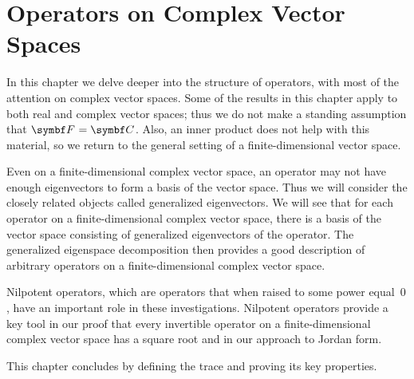 
\chapter{Operators on Complex Vector Spaces} \label{88}

In this chapter we delve deeper into the structure of operators, with most of the attention on complex vector spaces. Some of the results in this chapter apply to both real and complex vector spaces; thus we do not make a standing assumption that $\F{} = \C{}$. Also, an inner product does not help with this material, so we return to the general setting of a finite-dimensional vector space.

Even on a finite-dimensional complex vector space, an operator may not have enough eigenvectors to form a basis of the vector space. Thus we will consider the closely related objects called generalized eigenvectors. We will see that for each operator on a finite-dimensional complex vector space, there is a basis of the vector space consisting of generalized eigenvectors of the operator. The generalized eigenspace decomposition then provides a good description of arbitrary operators on a finite-dimensional complex vector space.

Nilpotent operators, which are operators that when raised to some power equal~$0$, have an important role in these investigations. Nilpotent operators provide a key tool in our proof that every invertible operator on a finite-dimensional complex vector space has a square root and in our approach to Jordan form.

This chapter concludes by defining the trace and proving its key properties.

